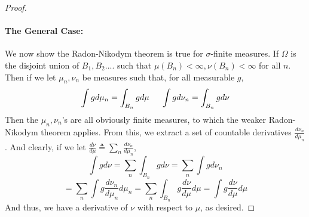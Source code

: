 \begin{proof}
    \paragraph{The General Case:} We now show the Radon-Nikodym theorem is true for 
    $\sigma$-finite measures. If $\Omega$ is the disjoint union of $B_1, B_2....$ such that 
    $\mu(B_n) <\infty, \nu(B_n) < \infty$ for all $n$. Then if we let $\mu_n, \nu_n$ be measures 
    such that, for all measurable $g$,
    \[ \int g d\mu_n = \int_{B_n} gd\mu \hspace{0.5cm} \int g d\nu_n = \int_{B_n}g d\nu \]
    Then the $\mu_n, \nu_n$'s are all obviously finite measures, to which the weaker Radon-Nikodym 
    theorem applies. From this, we extract a set of countable derivatives 
    $\frac{d\nu_n}{d\mu_n}$. And clearly, if we let $\frac{d\nu}{d\mu} \triangleq \sum_n \frac{d\nu_n}{d\mu_n}$,
    \[ \int gd\nu = \sum_n \int_{B_n}g d\nu = \sum_n \int gd\nu_n \] 
    \[ = \sum_n \int g \frac{d\nu_n}{d\mu_n}d\mu_n  = \sum_n \int_{B_n} g  \frac{d\nu}{d\mu}d\mu = \int g \frac{d\nu}{d\mu}d\mu \]
    And thus, we have a derivative of $\nu$ with respect to $\mu$, as desired.

\end{proof}




